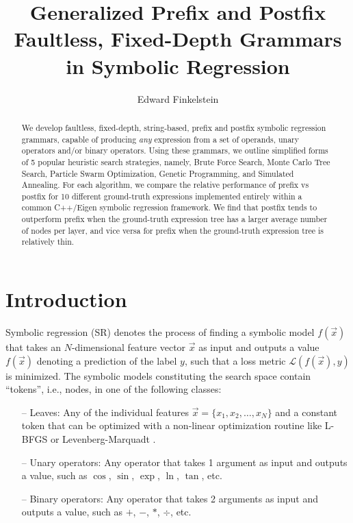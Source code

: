 \documentclass[runningheads]{llncs}
\begin{document}
%
\title{Generalized Prefix and Postfix Faultless, Fixed-Depth Grammars in Symbolic Regression}%
%
%
\author{Edward Finkelstein}%
%
%
%
\maketitle              %
%
\begin{abstract}
We develop faultless, fixed-depth, string-based, prefix and postfix symbolic regression grammars, capable of producing \emph{any} expression from a set of operands, unary operators and/or binary operators. Using these grammars, we outline simplified forms of 5 popular heuristic search strategies, namely, Brute Force Search,  Monte Carlo Tree Search, Particle Swarm Optimization, Genetic Programming, and Simulated Annealing. For each algorithm, we compare the relative performance of prefix vs postfix for 10 different ground-truth expressions implemented entirely within a common C++/Eigen symbolic regression framework. We find that postfix tends to outperform prefix when the ground-truth expression tree has a larger average number of nodes per layer, and vice versa for prefix when the ground-truth expression tree is relatively thin.

\end{abstract}

\section{Introduction}
Symbolic regression (SR) denotes the process of finding a symbolic model $f\left(\vec{x}\right)$ that takes an $N$-dimensional feature vector $\vec{x}$ as input and outputs a value $f\left(\vec{x}\right)$ denoting a prediction of the label $y$, such that a loss metric $\mathcal{L}\left(f\left(\vec{x}\right),y\right)$ is minimized. The symbolic models constituting the search space contain ``tokens'', i.e., nodes, in one of the following classes:
\begin{itemize}
\item[--] Leaves: Any of the individual features $\vec{x} = \{x_1, x_2, \ldots,x_{N}\}$ and a constant token that can be optimized with a non-linear optimization routine like L-BFGS \cite{doi:10.1137/0916069} or Levenberg-Marquadt \cite{83b09f23-b20e-3617-8f72-24765b713f7b} \cite{doi:10.1137/0111030}.
\item[--] Unary operators: Any operator that takes 1 argument as input and outputs a value, such as $\cos$, $\sin$, $\exp$, $\ln$, $\tan$, etc.
\item[--] Binary operators: Any operator that takes 2 arguments as input and outputs a value, such as $+$, $-$, $*$, $\div$, etc.
\end{itemize}
\end{document}
